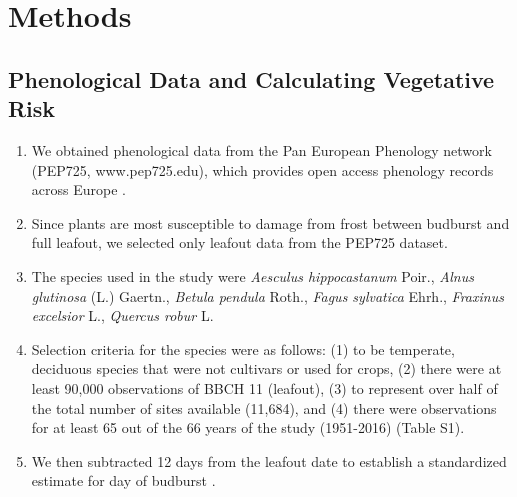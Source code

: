 \documentclass{article}\usepackage[]{graphicx}\usepackage[]{color}
\begin{document}
\section*{Methods}
\subsection*{Phenological Data and Calculating Vegetative Risk}
\begin{enumerate}
\item We obtained phenological data from the Pan European Phenology network (PEP725, www.pep725.edu), which provides open access phenology records across Europe \citep{Templ2018}.
\item Since plants are most susceptible to damage from frost between budburst and full leafout, we selected only leafout data \citep[i.e., in][BBCH 11, which is defined as the point of leaf unfolding and the first visible leaf stalk]{Meier2001} from the PEP725 dataset.
\item The species used in the study were \textit{Aesculus hippocastanum} Poir., \textit{Alnus glutinosa} (L.) Gaertn., \textit{Betula pendula} Roth., \textit{Fagus sylvatica} Ehrh., \textit{Fraxinus excelsior} L., \textit{Quercus robur} L.
\item Selection criteria for the species were as follows: (1) to be temperate, deciduous species that were not cultivars or used for crops, (2) there were at least 90,000 observations of BBCH 11 (leafout), (3) to represent over half of the total number of sites available (11,684), and (4) there were observations for at least 65 out of the 66 years of the study (1951-2016) (Table S1). %
\item We then subtracted 12 days from the leafout date to establish a standardized estimate for day of budburst \citep{Donnelly2017}. 
\end{enumerate}
\end{document}
